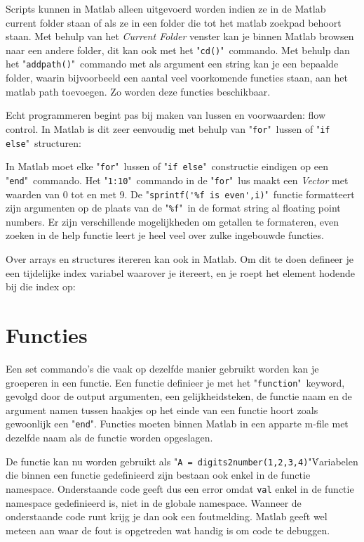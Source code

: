 \documentclass[11pt,twoside]{article}
\begin{document}
Scripts kunnen in Matlab alleen uitgevoerd worden indien ze in de Matlab current folder staan of als ze in een folder die tot het matlab zoekpad behoort staan. Met behulp van het \emph{Current Folder} venster kan je binnen Matlab browsen naar een andere folder, dit kan ook met het "\lstinline{cd()}"\ commando. Met behulp dan het "\lstinline{addpath()}"\ commando met als argument een string kan je een bepaalde folder, waarin bijvoorbeeld een aantal veel voorkomende functies staan, aan het matlab path toevoegen. Zo worden deze functies beschikbaar.

Echt programmeren begint pas bij maken van lussen en voorwaarden: flow control. In Matlab is dit zeer eenvoudig met behulp van "\lstinline{for}"\ lussen of "\lstinline{if else}"\ structuren:


In Matlab moet elke "\lstinline{for}"\ lussen of "\lstinline{if else}"\ constructie eindigen op een "\lstinline{end}"\ commando.
Het "\lstinline{1:10}"\ commando in de "\lstinline{for}"\ lus maakt een \emph{Vector} met waarden van 0 tot en met 9. De "\lstinline{sprintf('%f is even',i)}"\ functie formatteert zijn argumenten op de plaats van de "\lstinline{%f}"\ in de format string al floating point numbers. Er zijn verschillende mogelijkheden om getallen te formateren, even zoeken in de help functie leert je heel veel over zulke ingebouwde functies.

Over arrays en structures itereren kan ook in Matlab. Om dit te doen defineer je een tijdelijke index variabel waarover je itereert, en je roept het element hodende bij die index op:


	\section{Functies}
Een set commando's die vaak op dezelfde manier gebruikt worden kan je groeperen in een functie. Een functie definieer je met het "\lstinline{function}"\ keyword, gevolgd door de output argumenten, een gelijkheidsteken, de functie naam en de argument namen tussen haakjes op het einde van een functie hoort zoals gewoonlijk een "\lstinline{end}". Functies moeten binnen Matlab in een apparte m-file met dezelfde naam als de functie worden opgeslagen.


De functie kan nu worden gebruikt als "\lstinline{A = digits2number(1,2,3,4)}"\. Variabelen die binnen een functie gedefinieerd zijn bestaan ook enkel in de functie namespace. Onderstaande code geeft dus een error omdat \lstinline{val} enkel in de functie namespace gedefinieerd is, niet in de globale namespace. Wanneer de onderstaande code runt krijg je dan ook een foutmelding. Matlab geeft wel meteen aan waar de fout is opgetreden wat handig is om code te debuggen.

\end{document}

